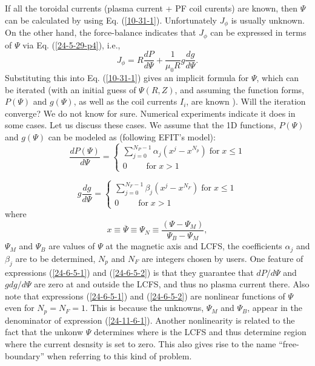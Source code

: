 \documentclass{llncs}
\newcommand{\tmop}[1]{\ensuremath{\operatorname{#1}}}
\begin{document}
If all the toroidal currents (plasma current + PF coil curents) are known,
then $\Psi$ can be calculated by using Eq. (\ref{10-31-1}). Unfortunately
$J_{\phi}$ is usually unknown. On the other hand, the force-balance indicates
that $J_{\phi}$ can be expressed in terms of $\Psi$ via Eq.
(\ref{24-5-29-p4}), i.e.,
\begin{equation}
  \label{24-6-5-5} J_{\phi} = R \frac{d P}{d \Psi} + \frac{1}{\mu_0 R} g
  \frac{d g}{d \Psi} .
\end{equation}
Substituting this into Eq. (\ref{10-31-1}) gives an implicit formula for
$\Psi$, which can be iterated (with an initial guess of $\Psi (R, Z)$, and
assuming the function forms, $P (\Psi)$ and $g (\Psi)$, as well as the coil
currents $I_i$, are known ). Will the iteration converge? We do not know for
sure. Numerical experiments indicate it does in some cases{\cite{lao1985}}.
Let us discuss these cases. We assume that the 1D functions, $P (\Psi)$ and $g
(\Psi)$ can be modeled as (following EFIT's model):
\begin{equation}
  \label{24-6-5-1} \frac{d P (\Psi)}{d \Psi} = \left\{ \begin{array}{l}
    \sum_{j = 0}^{N_P - 1} \alpha_j (x^j - x^{N_p}) \tmop{for} x \leqslant 1\\
    0 \qquad \tmop{for} x > 1
  \end{array} \right.
\end{equation}

\begin{equation}
  \label{24-6-5-2} g \frac{d g}{d \Psi} = \left\{ \begin{array}{l}
    \sum_{j = 0}^{N_F - 1} \beta_j (x^j - x^{N_F}) \tmop{for} x \leqslant 1\\
    0 \qquad \tmop{for} x > 1
  \end{array} \right.
\end{equation}
where
\begin{equation}
  \label{24-11-6-1} x \equiv \overline{\Psi} \equiv \Psi_N \equiv \frac{(\Psi
  - \Psi_M)}{\Psi_B - \Psi_M},
\end{equation}
$\Psi_M$ and $\Psi_B$ are values of $\Psi$ at the magnetic axis and LCFS, the
coefficients $\alpha_j$ and $\beta_j$ are to be determined, $N_p$ and $N_F$
are integers chosen by users. One feature of expressions (\ref{24-6-5-1}) and
(\ref{24-6-5-2}) is that they guarantee that $d P / d \Psi$ and $g d g / d
\Psi$ are zero at and outside the LCFS, and thus no plasma current there. Also
note that expressions (\ref{24-6-5-1}) and (\ref{24-6-5-2}) are nonlinear
functions of $\Psi$ even for $N_p = N_F = 1$. This is because the unknowns,
$\Psi_M$ and $\Psi_B$, appear in the denominator of expression
(\ref{24-11-6-1}). Another nonlinearity is related to the fact that the unkonw
$\Psi$ determines where is the LCFS and thus determine region where the
current desnsity is set to zero. This also gives rise to the name
``free-boundary'' when referring to this kind of problem.
\end{document}

